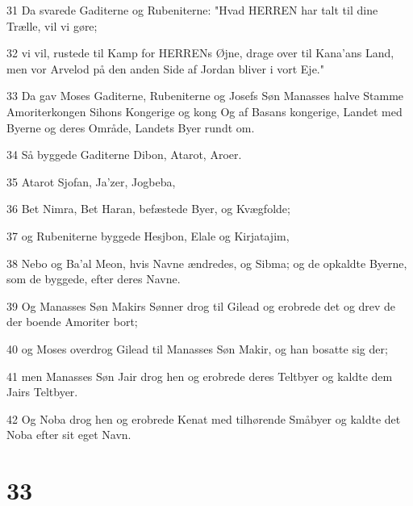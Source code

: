 \par 31 Da svarede Gaditerne og Rubeniterne: "Hvad HERREN har talt til dine Trælle, vil vi gøre;
\par 32 vi vil, rustede til Kamp for HERRENs Øjne, drage over til Kana'ans Land, men vor Arvelod på den anden Side af Jordan bliver i vort Eje."
\par 33 Da gav Moses Gaditerne, Rubeniterne og Josefs Søn Manasses halve Stamme Amoriterkongen Sihons Kongerige og kong Og af Basans kongerige, Landet med Byerne og deres Område, Landets Byer rundt om.
\par 34 Så byggede Gaditerne Dibon, Atarot, Aroer.
\par 35 Atarot Sjofan, Ja'zer, Jogbeba,
\par 36 Bet Nimra, Bet Haran, befæstede Byer, og Kvægfolde;
\par 37 og Rubeniterne byggede Hesjbon, Elale og Kirjatajim,
\par 38 Nebo og Ba'al Meon, hvis Navne ændredes, og Sibma; og de opkaldte Byerne, som de byggede, efter deres Navne.
\par 39 Og Manasses Søn Makirs Sønner drog til Gilead og erobrede det og drev de der boende Amoriter bort;
\par 40 og Moses overdrog Gilead til Manasses Søn Makir, og han bosatte sig der;
\par 41 men Manasses Søn Jair drog hen og erobrede deres Teltbyer og kaldte dem Jairs Teltbyer.
\par 42 Og Noba drog hen og erobrede Kenat med tilhørende Småbyer og kaldte det Noba efter sit eget Navn.

\chapter{33}

